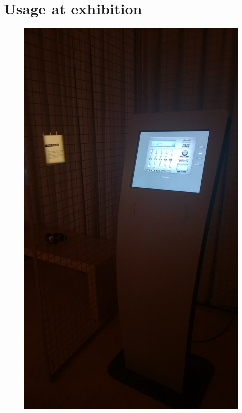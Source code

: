 \section{Usage at exhibition} 
\begin{figure}[htbp]
\begin{center}
\includegraphics[scale=0.1]{Figures/kiosk1.jpg}

\vspace{1cm}


\end{center}
\end{figure}
